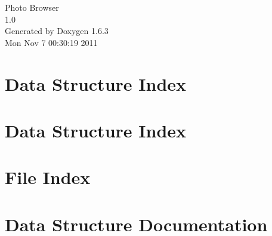 \documentclass[a4paper]{book}
\begin{document}
\hypersetup{pageanchor=false}
\begin{titlepage}
\vspace*{7cm}
\begin{center}
{\Large Photo Browser \\[1ex]\large 1.0 }\\
\vspace*{1cm}
{\large Generated by Doxygen 1.6.3}\\
\vspace*{0.5cm}
{\small Mon Nov 7 00:30:19 2011}\\
\end{center}
\end{titlepage}
\clearemptydoublepage
{}
\tableofcontents
\clearemptydoublepage
{}
\hypersetup{pageanchor=true}
\chapter{Data Structure Index}

\chapter{Data Structure Index}

\chapter{File Index}

\chapter{Data Structure Documentation}































\end{document}

